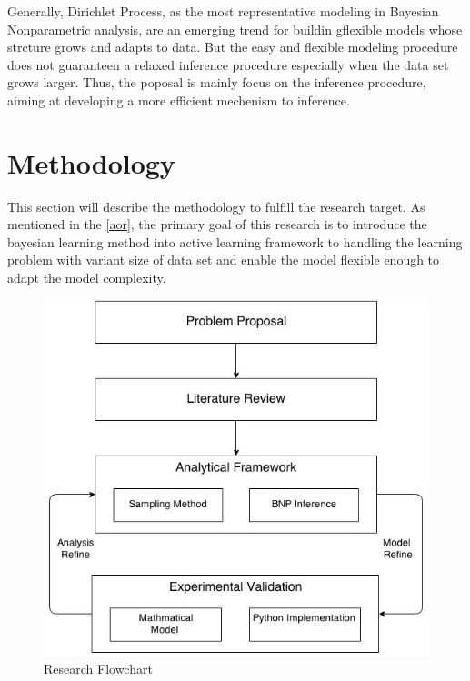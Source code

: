 \documentclass[a4paper,14pt]{article}
\begin{document}
Generally, Dirichlet Process, as the most representative modeling in Bayesian Nonparametric analysis, are an emerging trend for buildin gflexible models whose strcture grows and adapts to data. But the easy and flexible modeling procedure does not guaranteen a relaxed inference procedure especially when the data set grows larger. Thus, the poposal is mainly focus on the inference procedure, aiming at developing a more efficient mechenism to inference.  
\section{Methodology}

This section will describe the methodology to fulfill the research target. As mentioned in the \ref{aor}, the primary goal of this research is to introduce the bayesian learning method into active learning framework to handling the learning problem with variant size of data set and enable the model flexible enough to adapt the model complexity. 
\begin{figure}[htbp]
	\centering
	\includegraphics[width=\linewidth]{proposal}
	\caption{Research Flowchart}
	\label{fig:proposal}
\end{figure}
\end{document}
